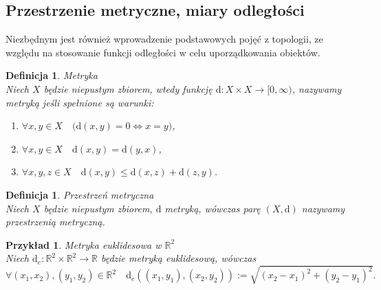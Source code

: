 \documentclass[12pt,a4paper]{report}
\newtheorem{definition}[theorem]{Definicja}
\newtheorem{example}{Przykład}
\begin{document}
\subsection{Przestrzenie metryczne, miary odległości}
\noindent

Niezbędnym jest również wprowadzenie podstawowych pojęć z topologii, ze względu na stosowanie funkcji odległości w celu uporządkowania obiektów.\\

\begin{definition}{Metryka \cite[Rozdzial 9]{kuratowski2004}\\}
Niech $X$ będzie niepustym zbiorem, wtedy funkcję $\mathrm{d}: X \times X \rightarrow [0,\infty)$, nazywamy metryką jeśli spełnione są warunki:
\begin{enumerate}
\item $\forall x, y \in X \quad \big(\mathrm{d}(x,y) = 0  \Longleftrightarrow x=y \big)$,
\item $\forall x, y \in X \quad \mathrm{d}(x,y)=\mathrm{d}(y,x)$,
\item $\forall  x, y, z \in X \quad \mathrm{d}(x,y)\leq \mathrm{d}(x,z)+\mathrm{d}(z,y)$.\\
\end{enumerate}
\end{definition}

\begin{definition}{Przestrzeń metryczna \cite[Rozdział 9]{kuratowski2004}\\}
Niech $X$ będzie niepustym zbiorem, $\mathrm{d}$ metryką, wówczas parę $(X,\mathrm{d})$ nazywamy przestrzenią metryczną. \\
\end{definition}

\begin{example}{Metryka euklidesowa w $\mathbb{R}^2$}\\
Niech $\mathrm{d}_e: \mathbb{R}^2 \times \mathbb{R}^2 \rightarrow \mathbb{R}$ będzie metryką euklidesową, wówczas \\$\forall{(x_{1},x_{2}),(y_{1},y_{2}) \in \mathbb{R}^2} \quad \mathrm{d}_e((x_1,y_1),(x_2,y_2)):= \sqrt{(x_2-x_1)^2+(y_2-y_1)^2}. $
\end{example}
\end{document}
